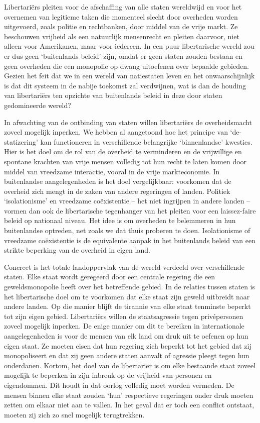 \documentclass[
  a5paper,
  smalldemyvopaper,10pt,twoside,onecolumn,openright,extrafontsizes,hidelinks]{memoir}
\begin{document}
Libertariërs pleiten voor de afschaffing van alle staten wereldwijd en
voor het overnemen van legitieme taken die momenteel slecht door
overheden worden uitgevoerd, zoals politie en rechtbanken, door middel
van de vrije markt. Ze beschouwen vrijheid als een natuurlijk
mensenrecht en pleiten daarvoor, niet alleen voor Amerikanen, maar voor
iedereen. In een puur libertarische wereld zou er dus geen `buitenlands
beleid' zijn, omdat er geen staten zouden bestaan en geen overheden die
een monopolie op dwang uitoefenen over bepaalde gebieden. Gezien het
feit dat we in een wereld van natiestaten leven en het onwaarschijnlijk
is dat dit systeem in de nabije toekomst zal verdwijnen, wat is dan de
houding van libertariërs ten opzichte van buitenlands beleid in deze
door staten gedomineerde wereld?

In afwachting van de ontbinding van staten willen libertariërs de
overheidsmacht zoveel mogelijk inperken. We hebben al aangetoond hoe het
principe van `de-statizering' kan functioneren in verschillende
belangrijke `binnenlandse' kwesties. Hier is het doel om de rol van de
overheid te verminderen en de vrijwillige en spontane krachten van vrije
mensen volledig tot hun recht te laten komen door middel van vreedzame
interactie, vooral in de vrije markteconomie. In buitenlandse
aangelegenheden is het doel vergelijkbaar: voorkomen dat de overheid
zich mengt in de zaken van andere regeringen of landen. Politiek
`isolationisme' en vreedzame coëxistentie -- het niet ingrijpen in
andere landen -- vormen dan ook de libertarische tegenhanger van het
pleiten voor een laissez-faire beleid op nationaal niveau. Het idee is
om overheden te belemmeren in hun buitenlandse optreden, net zoals we
dat thuis proberen te doen. Isolationisme of vreedzame coëxistentie is
de equivalente aanpak in het buitenlands beleid van een strikte
beperking van de overheid in eigen land.

Concreet is het totale landoppervlak van de wereld verdeeld over
verschillende staten. Elke staat wordt geregeerd door een centrale
regering die een geweldsmonopolie heeft over het betreffende gebied. In
de relaties tussen staten is het libertarische doel om te voorkomen dat
elke staat zijn geweld uitbreidt naar andere landen. Op die manier
blijft de tirannie van elke staat tenminste beperkt tot zijn eigen
gebied. Libertariërs willen de staatsagressie tegen privépersonen zoveel
mogelijk inperken. De enige manier om dit te bereiken in internationale
aangelegenheden is voor de mensen van elk land om druk uit te oefenen op
hun eigen staat. Ze moeten eisen dat hun regering zich beperkt tot het
gebied dat zij monopoliseert en dat zij geen andere staten aanvalt of
agressie pleegt tegen hun onderdanen. Kortom, het doel van de
libertariër is om elke bestaande staat zoveel mogelijk te beperken in
zijn inbreuk op de vrijheid van personen en eigendommen. Dit houdt in
dat oorlog volledig moet worden vermeden. De mensen binnen elke staat
zouden `hun' respectieve regeringen onder druk moeten zetten om elkaar
niet aan te vallen. In het geval dat er toch een conflict ontstaat,
moeten zij zich zo snel mogelijk terugtrekken.
\end{document}
